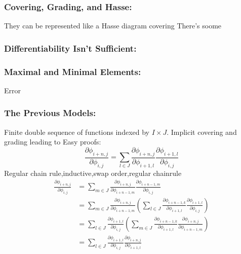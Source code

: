 \subsubsection{Covering, Grading, and Hasse:}
\begin{center}
\quad
{}
\end{center}

They can be represented like a Hasse diagram
covering 
There's soome 

\subsubsection{Differentiability Isn't Sufficient:}

\subsubsection{Maximal and Minimal Elements:}
Error

\subsubsection{The Previous Models:}
Finite double sequence of functions indexed by $I\times J$.
Implicit covering and grading leading to Easy proofs:
\[\frac{\partial \phi_{i+n,j}}{\partial \phi_{i,j}} = \sum_{l\in J}\frac{\partial \phi_{i+n,j}}{\partial \phi_{i+1,l}}\frac{\partial \phi_{i+1,l}}{\partial \phi_{i,j}}\]
Regular chain rule,inductive,swap order,regular chainrule
\[\begin{aligned}
	\frac{\partial \phi_{i+n,j}}{\partial \phi_{i,j}} &= \sum_{m\in J}\frac{\partial \phi_{i+n,j}}{\partial \phi_{i+n-1,m}}\frac{\partial \phi_{i+n-1,m}}{\partial \phi_{i,j}}\\
	&= \sum_{m\in J}\frac{\partial \phi_{i+n,j}}{\partial \phi_{i+n-1,m}}\left(\sum_{l\in J}\frac{\partial \phi_{i+n-1,k}}{\partial \phi_{i+1,l}}\frac{\partial \phi_{i+1,l}}{\partial \phi_{i,j}}\right)\\
	&= \sum_{l\in J}\frac{\partial \phi_{i+1,l}}{\partial \phi_{i,j}}\left(\sum_{m\in J}\frac{\partial \phi_{i+n-1,k}}{\partial \phi_{i+1,l}}\frac{\partial \phi_{i+n,j}}{\partial \phi_{i+n-1,m}}\right)\\
	&= \sum_{l\in J}\frac{\partial \phi_{i+1,l}}{\partial \phi_{i,j}}\frac{\partial \phi_{i+n,j}}{\partial \phi_{i+1,l}}\\
\end{aligned}\]
